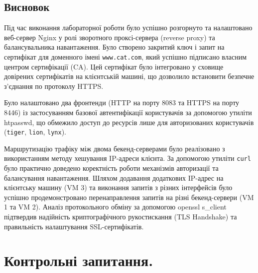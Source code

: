 \documentclass[14pt, a4paper]{extreport}
\begin{document}
	\subsection*{Висновок}
	
	Під час виконання лабораторної роботи було успішно розгорнуто та налаштовано веб-сервер Nginx у ролі зворотного проксі-сервера (reverse proxy) та балансувальника навантаження. Було створено закритий ключ і запит на сертифікат для доменного імені \texttt{www.cat.com}, який успішно підписано власним центром сертифікації (CA). Цей сертифікат було інтегровано у сховище довірених сертифікатів на клієнтській машині, що дозволило встановити безпечне з'єднання по протоколу HTTPS.
	
	Було налаштовано два фронтенди (HTTP на порту 8083 та HTTPS на порту 8446) із застосуванням базової автентифікації користувачів за допомогою утиліти htpasswd, що обмежило доступ до ресурсів лише для авторизованих користувачів (\texttt{tiger}, \texttt{lion}, \texttt{lynx}).
	
	Маршрутизацію трафіку між двома бекенд-серверами було реалізовано з використанням методу хешування IP-адреси клієнта. За допомогою утиліти \texttt{curl} було практично доведено коректність роботи механізмів авторизації та балансування навантаження. Шляхом додавання додаткових IP-адрес на клієнтську машину (VM 3) та виконання запитів з різних інтерфейсів було успішно продемонстровано перенаправлення запитів на різні бекенд-сервери (VM 1 та VM 2). Аналіз протокольного обміну за допомогою openssl s\_client підтвердив надійність криптографічного рукостискання (TLS Handshake) та правильність налаштування SSL-сертифікатів.
	
	\section*{Контрольні запитання.}
	
\end{document}
